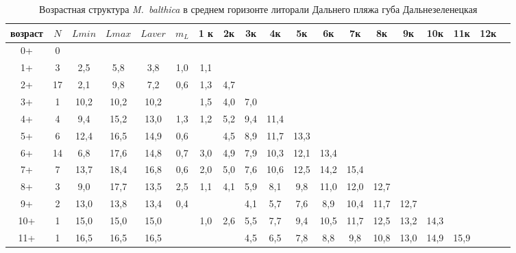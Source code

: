 \begin{landscape}
\begin{table}[h]
\caption{Возрастная структура {\it M.~balthica} в среднем горизонте литорали Дальнего пляжа губа Дальнезеленецкая}
\label{tab:DP_sgl_growth_matrix}
\begin{tabular}{|c|c|cc|cc|ccccccccccccc|}
    \hline
возраст & $N$  & $L min$ & $L max$ & $L aver$ & $m_L$   & 1 к & 2к  & 3к  & 4к   & 5к   & 6к   & 7к   & 8к   & 9к   & 10к  & 11к  & 12к  &  \\ \hline
0+      & 0  &       &       &         &         &     &     &     &      &      &      &      &      &      &      &      &      &  \\
1+      & 3  & 2,5   & 5,8   & 3,8     & 1,0     & 1,1 &     &     &      &      &      &      &      &      &      &      &      &  \\
2+      & 17 & 2,1   & 9,8   & 7,2     & 0,6     & 1,3 & 4,7 &     &      &      &      &      &      &      &      &      &      &  \\
3+      & 1  & 10,2  & 10,2  & 10,2    &         & 1,5 & 4,0 & 7,0 &      &      &      &      &      &      &      &      &      &  \\
4+      & 4  & 9,4   & 15,2  & 13,0    & 1,3     & 1,2 & 5,2 & 9,4 & 11,4 &      &      &      &      &      &      &      &      &  \\
5+      & 6  & 12,4  & 16,5  & 14,9    & 0,6     &     & 4,5 & 8,9 & 11,7 & 13,3 &      &      &      &      &      &      &      &  \\
6+      & 14 & 6,8   & 17,6  & 14,8    & 0,7     & 3,0 & 4,9 & 7,9 & 10,3 & 12,1 & 13,4 &      &      &      &      &      &      &  \\
7+      & 7  & 13,7  & 18,4  & 16,8    & 0,6     & 2,0 & 5,0 & 7,6 & 10,6 & 12,5 & 14,2 & 15,4 &      &      &      &      &      &  \\
8+      & 3  & 9,0   & 17,7  & 13,5    & 2,5     & 1,1 & 4,1 & 5,9 & 8,1  & 9,8  & 11,0 & 12,0 & 12,7 &      &      &      &      &  \\
9+      & 2  & 13,0  & 13,8  & 13,4    & 0,4     &     &     & 4,1 & 5,7  & 7,6  & 8,9  & 10,4 & 11,7 & 12,7 &      &      &      &  \\
10+     & 1  & 15,0  & 15,0  & 15,0    &         & 1,0 & 2,6 & 5,5 & 7,7  & 9,4  & 10,5 & 11,7 & 12,5 & 13,2 & 14,3 &      &      &  \\
11+     & 1  & 16,5  & 16,5  & 16,5    &         &     &     & 4,5 & 6,5  & 7,8  & 8,8  & 9,8  & 10,8 & 13,0 & 14,9 & 15,9 &      &  \\

\end{tabular}
\end{table}
\end{landscape}
